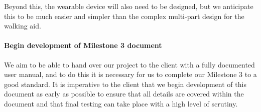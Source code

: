 {Beyond this, the wearable device will also need to be designed, but we anticipate this to be much easier and simpler than the complex multi-part design for the walking aid.

\paragraph{Begin development of Milestone 3 document}

We aim to be able to hand over our project to the client with a fully documented user manual, and to do this it is necessary for us to complete our Milestone 3 to a good standard. It is imperative to the client that we begin development of this document as early as possible to ensure that all details are covered within the document and that final testing can take place with a high level of scrutiny.

}
